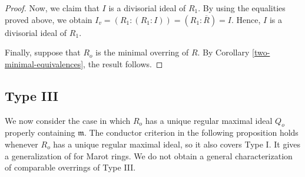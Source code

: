 \documentclass[12pt]{article}
\begin{document}
\begin{proof}
		\smallskip
		Now, we claim that $I$ is a divisorial ideal of $R_1$. By using the equalities proved above, we obtain $I_v=(R_1:(R_1:I))=(R_1:\overline R)=I$. Hence, $I$ is a divisorial ideal of $R_1$.
		
		\smallskip
		Finally, suppose that $R_o$ is the minimal overring of $R$. By Corollary \ref{two-minimal-equivalences}, the result follows.
	\end{proof}

\subsection{Type III}\label{subsec-type-iii}
We now consider the case in which $R_o$ has a unique regular maximal ideal $Q_o$ properly containing $\mathfrak m$. The conductor criterion in the following proposition holds whenever $R_o$ has a unique regular maximal ideal, so it also covers Type I. It gives a generalization of \cite[Proposition 27]{ayache} for Marot rings. We do not obtain a general characterization of comparable overrings of Type III.
\end{document}

